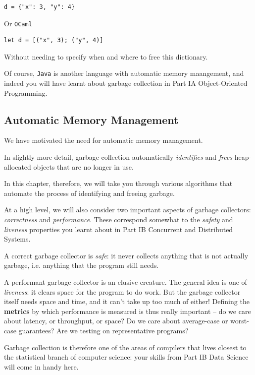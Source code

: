 \begin{verbatim}
d = {"x": 3, "y": 4}
\end{verbatim}
Or \texttt{OCaml}
\begin{verbatim}
let d = [("x", 3); ("y", 4)]
\end{verbatim}
Without needing to specify when and where to free this dictionary.

Of course, \texttt{Java} is another language with automatic memory maangement, and indeed you will have learnt about garbage collection in \textsf{Part IA Object-Oriented Programming}.

\subsection{Automatic Memory Management}
We have motivated the need for automatic memory management.

In slightly more detail, garbage collection automatically \textit{identifies} and \textit{frees} heap-allocated objects that are no longer in use. 

In this chapter, therefore, we will take you through various algorithms that automate the process of identifying and freeing garbage.

At a high level, we will also consider two important aspects of garbage collectors: \textit{correctness} and \textit{performance}. These correspond somewhat to the \textit{safety} and \textit{liveness} properties you learnt about in \textsf{Part IB Concurrent and Distributed Systems}.

A correct garbage collector is \textit{safe}: it never collects anything that is not actually garbage, i.e. anything that the program still needs.

A performant garbage collector is an elusive creature. The general idea is one of \textit{liveness}: it clears space for the program to do work. But the garbage collector itself needs space and time, and it can't take up too much of either! Defining the \textbf{metrics} by which performance is measured is thus really important -- do we care about latency, or throughput, or space? Do we care about average-case or worst-case guarantees? Are we testing on representative programs? 

Garbage collection is therefore one of the areas of compilers that lives closest to the statistical branch of computer science: your skills from \textsf{Part IB Data Science} will come in handy here.

